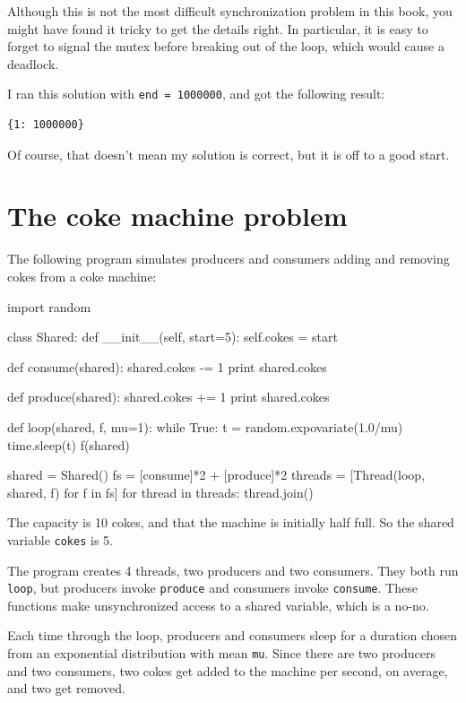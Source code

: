 \documentclass{book}
\begin{document}
Although this is not the most difficult synchronization problem
in this book, you might have found it tricky to get the details
right.  In particular, it is easy to forget to signal the mutex
before breaking out of the loop, which would cause a deadlock.

I ran this solution with {\tt end = 1000000}, and got the
following result:

\begin{verbatim}
{1: 1000000}
\end{verbatim}

Of course, that doesn't mean my solution is correct, but it is
off to a good start.



\section {The coke machine problem}

The following program simulates producers and consumers
adding and removing cokes from a coke machine:
\begin{unbreakable}[]{}
import random

class Shared:
    def __init__(self, start=5):
        self.cokes = start

def consume(shared):
    shared.cokes -= 1
    print shared.cokes

def produce(shared):
    shared.cokes += 1
    print shared.cokes

def loop(shared, f, mu=1):
    while True:
        t = random.expovariate(1.0/mu)
        time.sleep(t)
        f(shared)

shared = Shared()
fs = [consume]*2 + [produce]*2 
threads = [Thread(loop, shared, f) 
  for f in fs]
for thread in threads: thread.join()
\end{unbreakable}

The capacity is 10 cokes, and that the machine is initially
half full.  So the shared variable {\tt cokes} is 5.

The program creates 4 threads, two producers and two consumers.
They both run {\tt loop}, but producers invoke {\tt produce}
and consumers invoke {\tt consume}.  These functions make
unsynchronized access to a shared variable, which is a no-no.

Each time through the loop, producers and consumers sleep for a
duration chosen from an exponential distribution with mean {\tt mu}.
Since there are two producers and two consumers, two cokes get added
to the machine per second, on average, and two get removed.
\end{document}
